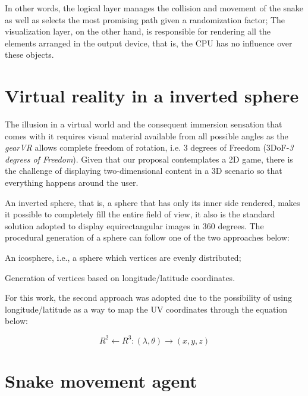\documentclass[12pt]{article}
\begin{document}
In other words, the logical layer manages the collision and movement of the snake as well as selects the most promising path given a randomization factor; The visualization layer, on the other hand, is responsible for rendering all the elements arranged in the output device, that is, the CPU has no influence over these objects.

\section{Virtual reality in a inverted sphere}
The illusion in a virtual world and the consequent immersion sensation that comes with it requires visual material available from all possible angles as the \textit{gearVR} allows complete freedom of rotation, i.e. 3 degrees of Freedom (3DoF-\textit{3 degrees of Freedom}). Given that our proposal contemplates a 2D game, there is the challenge of displaying two-dimensional content in a 3D scenario so that everything happens around the user.

An inverted sphere, that is, a sphere that has only its inner side rendered, makes it possible to completely fill the entire field of view, it also is the standard solution adopted to display equirectangular images in 360 degrees. The procedural generation of a sphere can follow one of the two approaches below:

\begin{enumerate}
  \begin{item} An icosphere, i.e., a sphere which vertices are evenly distributed;
 \end{item}
  \begin{item} Generation of vertices based on longitude/latitude coordinates. \end{item}
\end{enumerate}

For this work, the second approach was adopted due to the possibility of using longitude/latitude as a way to map the UV coordinates through the equation below:

\begin{equation}
R^2 \leftarrow R^3 : (\lambda, \theta) \rightarrow (x, y, z)
\label{equation1}
\end{equation}

\section{Snake movement agent} \label{sec:agent}
\end{document}
